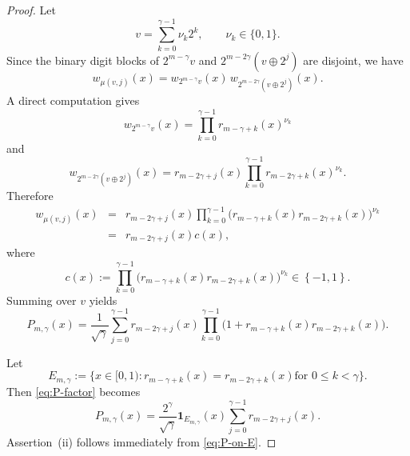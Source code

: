 \documentclass[11pt]{amsart}
\numberwithin{equation}{section}
\theoremstyle{plain}
\begin{document}
\begin{proof}
Let 
\begin{equation*}
v=\sum_{k=0}^{\gamma -1}\nu _{k}2^{k},\qquad \nu _{k}\in \{0,1\}.
\end{equation*}%
Since the binary digit blocks of $2^{m-\gamma }v$ and $2^{m-2\gamma
}(v\oplus 2^{j})$ are disjoint, we have 
\begin{equation*}
w_{\mu (v,j)}(x)=w_{2^{m-\gamma }v}(x)\,w_{2^{m-2\gamma }(v\oplus 2^{j})}(x).
\end{equation*}%
A direct computation gives 
\begin{equation*}
w_{2^{m-\gamma }v}(x)=\prod_{k=0}^{\gamma -1}r_{m-\gamma +k}(x)^{\nu _{k}}
\end{equation*}%
and 
\begin{equation*}
w_{2^{m-2\gamma }(v\oplus 2^{j})}(x)=r_{m-2\gamma +j}(x)\prod_{k=0}^{\gamma
-1}r_{m-2\gamma +k}(x)^{\nu _{k}}.
\end{equation*}%
Therefore 
\begin{eqnarray*}
w_{\mu (v,j)}(x) &=&r_{m-2\gamma +j}(x)\prod_{k=0}^{\gamma -1}\bigl(%
r_{m-\gamma +k}(x)r_{m-2\gamma +k}(x)\bigr)^{\nu _{k}} \\
&=&r_{m-2\gamma +j}(x)c\left( x\right) ,
\end{eqnarray*}%
where%
\begin{equation*}
c\left( x\right) :=\prod_{k=0}^{\gamma -1}\bigl(r_{m-\gamma
+k}(x)r_{m-2\gamma +k}(x)\bigr)^{\nu _{k}}\in \left\{ -1,1\right\} .
\end{equation*}%
Summing over $v$ yields 
\begin{equation}
P_{m,\gamma }(x)=\frac{1}{\sqrt{\gamma }}\sum_{j=0}^{\gamma -1}r_{m-2\gamma
+j}(x)\prod_{k=0}^{\gamma -1}\bigl(1+r_{m-\gamma +k}(x)r_{m-2\gamma +k}(x)%
\bigr).  \label{eq:P-factor}
\end{equation}

Let 
\begin{equation*}
E_{m,\gamma}:=\bigl\{x\in[0,1): r_{m-\gamma+k}(x)=r_{m-2\gamma+k}(x)\text{
for }0\le k<\gamma\bigr\}.
\end{equation*}
Then \eqref{eq:P-factor} becomes 
\begin{equation}  \label{eq:P-on-E}
P_{m,\gamma}(x)=\frac{2^{\gamma}}{\sqrt{\gamma}}\mathbf{1}%
_{E_{m,\gamma}}(x)\sum_{j=0}^{\gamma-1} r_{m-2\gamma+j}(x).
\end{equation}
Assertion~(ii) follows immediately from \eqref{eq:P-on-E}.


\end{proof}
\end{document}
